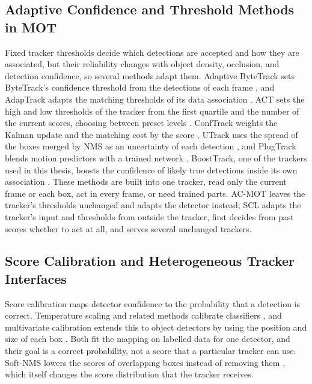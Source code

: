 \subsection{Adaptive Confidence and Threshold Methods in MOT}\label{sec:rw-thresholds}
Fixed tracker thresholds decide which detections are accepted and how they are associated, but their reliability changes with object density, occlusion, and detection confidence, so several methods adapt them. Adaptive ByteTrack sets ByteTrack's confidence threshold from the detections of each frame \cite{ma2023adaptivebytetrack}, and AdapTrack adapts the matching thresholds of its data association \cite{shim2024adaptrack}. ACT sets the high and low thresholds of the tracker from the first quartile and the number of the current scores, choosing between preset levels \cite{act2026adaptive}. ConfTrack weights the Kalman update and the matching cost by the score \cite{jung2024conftrack}, UTrack uses the spread of the boxes merged by NMS as an uncertainty of each detection \cite{solano2025utrack}, and PlugTrack blends motion predictors with a trained network \cite{kim2026plugtrack}. BoostTrack, one of the trackers used in this thesis, boosts the confidence of likely true detections inside its own association \cite{stanojevic2024boosttrack}. These methods are built into one tracker, read only the current frame or each box, act in every frame, or need trained parts. AC-MOT leaves the tracker's thresholds unchanged and adapts the detector instead; SCL adapts the tracker's input and thresholds from outside the tracker, first decides from past scores whether to act at all, and serves several unchanged trackers.

\subsection{Score Calibration and Heterogeneous Tracker Interfaces}\label{sec:rw-calibration}
Score calibration maps detector confidence to the probability that a detection is correct. Temperature scaling and related methods calibrate classifiers \cite{guo2017calibration}, and multivariate calibration extends this to object detectors by using the position and size of each box \cite{kuppers2020detcalib}. Both fit the mapping on labelled data for one detector, and their goal is a correct probability, not a score that a particular tracker can use. Soft-NMS lowers the scores of overlapping boxes instead of removing them \cite{bodla2017softnms}, which itself changes the score distribution that the tracker receives.

